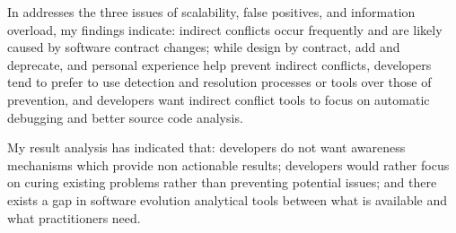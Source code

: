 In addresses the three issues of scalability, false positives, and information overload, my findings indicate:
indirect conflicts occur frequently and are likely caused by software contract changes;
while design by contract, add and deprecate, and personal experience help prevent indirect conflicts,
developers tend to prefer to use detection and resolution processes or tools
over those of prevention, and developers want indirect conflict tools to focus on automatic debugging and better source code analysis.

My result analysis has indicated that: developers do not want awareness mechanisms which provide non actionable results; developers
would rather focus on curing existing problems rather than preventing potential issues;
and there exists a gap in software evolution analytical tools between what is available and what practitioners need.
